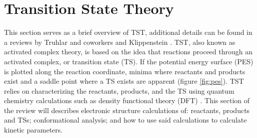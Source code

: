 \documentclass[preprint, 11pt]{elsarticle} %
\begin{document}
\section{Transition State Theory}

This section serves as a brief overview of TST, additional details can be found in a reviews by Truhlar and coworkers \cite{truhlar:1996} and Klippenstein \cite{Klippenstein:2017eu}.
TST, also known as activated complex theory, is based on the idea that reactions proceed through an activated complex, or transition state (TS).
If the potential energy surface (PES) is plotted along the reaction coordinate, minima where reactants and products exist and a saddle point where a TS exists are apparent (figure \ref{fig:pes}). 
TST relies on characterizing the reactants, products, and the TS using quantum chemistry calculations such as density functional theory (DFT) \cite{DFT:1964}.
This section of the review will describes electronic structure calculations of: reactants, products and TSs; conformational analysis; and how to use said calculations to calculate kinetic parameters.
\end{document}
